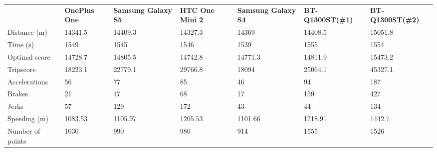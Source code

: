 \begin{landscape}
\begin{table*}[h]
\begin{minipage}{0.95\textwidth}
\begin{tabular}{|l|llllll|}
                 & \textbf{OnePlus One} & \textbf{Samsung Galaxy S5} & \textbf{HTC One Mini 2} & \textbf{Samsung Galaxy S4} & \textbf{BT-Q1300ST(\#1)} & \textbf{BT-Q1300ST(\#2)} \\
Distance (m)     & 14341.5     & 14409.3           & 14327.3        & 14369             & 14408.5         & 15051.8         \\
Time (s)         & 1549        & 1545              & 1546           & 1539              & 1555            & 1554            \\
Optimal score    & 14728.7     & 14805.5           & 14742.8        & 14771.3           & 14811.9         & 15473.2         \\
Tripscore        & 18223.1     & 22779.1           & 29766.8        & 18094             & 25064.1         & 45327.1         \\
Accelerations    & 56          & 77                & 85             & 46                & 94              & 187             \\
Brakes           & 21          & 47                & 68             & 17                & 159             & 427             \\
Jerks            & 57          & 129               & 172            & 43                & 44              & 134             \\
Speeding (m)     & 1083.53     & 1105.97           & 1205.53        & 1101.66           & 1218.91         & 1442.7          \\
Number of points & 1030        & 990               & 980            & 914               & 1555            & 1526            \\\hline
\end{tabular}
\end{minipage}
\end{table*}
\end{landscape}